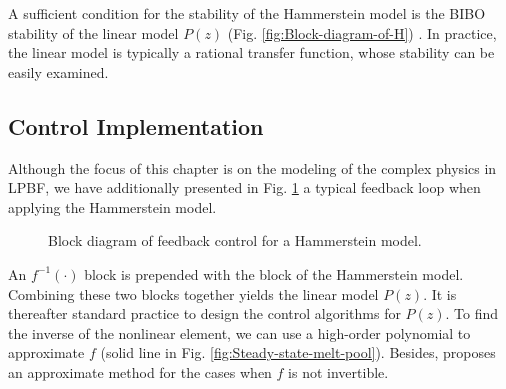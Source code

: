 \documentclass [11pt, proquest] {uwthesis}[2020/02/24]
\begin{document}
A sufficient condition for the stability of the Hammerstein model
is the BIBO stability of the linear model $P(z)$ (Fig. \ref{fig:Block-diagram-of-H})
\cite{doyle2002identification}. In practice, the linear model is
typically a rational transfer function, whose stability can be easily
examined.

\subsection{Control Implementation}

Although the focus of this chapter is on the modeling of the complex
physics in LPBF, we have additionally presented in Fig. \ref{fig:Block-diagram-RC-H} a typical
feedback loop when applying the Hammerstein model.
\begin{figure}[!ht]
\begin{centering}
\par\end{centering}
\caption{\label{fig:Block-diagram-RC-H}Block diagram of feedback control for
a Hammerstein model.}
\end{figure}
 An $f^{-1}(\cdot)$ block is prepended with the block of
the Hammerstein model. Combining these two blocks together yields
the linear model $P(z)$. It is thereafter standard practice to design
the control algorithms for $P(z)$. To find the inverse of the nonlinear
element, we can use a high-order polynomial to approximate $f$ (solid
line in Fig. \ref{fig:Steady-state-melt-pool}). Besides, \cite{rayouf2019new}
proposes an approximate method for the cases when $f$ is not invertible.
\end{document}
